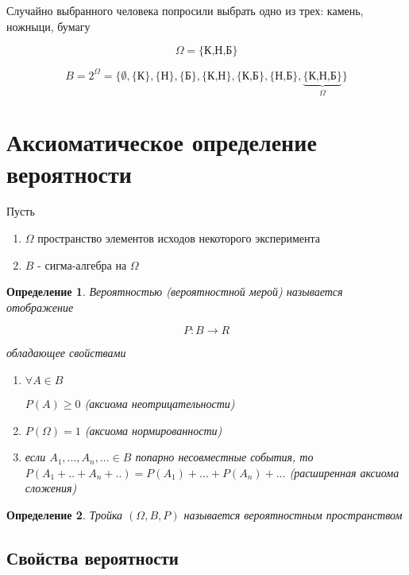 \documentclass[a4paper, 14pt]{report}
\newtheorem{defenition}{Определение}[section]
\begin{document}
Случайно выбранного человека попросили выбрать одно из трех: камень, ножныци, бумагу

$$
\Omega = \{\text{К,Н,Б}\}
$$

$$
B = 2^\Omega = \{ \emptyset, \{\text{К}\}, \{\text{Н}\}, \{\text{Б}\}, \{\text{К,Н}\}, \{\text{К,Б}\}, \{\text{Н,Б}\}, \underbrace{\{\text{К,Н,Б}\}}_\Omega \}
$$

\section{Аксиоматическое определение вероятности}

Пусть

\begin{enumerate}
    \item $\Omega$ пространство элементов исходов некоторого эксперимента
    \item $B$ - сигма-алгебра на $\Omega$
\end{enumerate}

\begin{defenition}
    Вероятностью (вероятностной мерой) называется отображение

    $$
    P: B \to R
    $$

    обладающее свойствами

    \begin{enumerate}
        \item $\forall A \in B$
        
        $ P(A) \geq 0$ (аксиома неотрицательности)
        \item $P(\Omega) = 1$ (аксиома нормированности)
        \item если $A_1, ..., A_n, ... \in B$ попарно несовместные события, то $P(A_1 + .. + A_n + ..) = P(A_1) + ... + P(A_n) + ...$ (расширенная аксиома сложения)
    \end{enumerate}
\end{defenition}

\begin{defenition}
    Тройка $(\Omega, B, P)$ называется вероятностным пространством
\end{defenition}

\subsection{Свойства вероятности}
\end{document}
